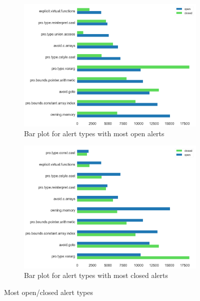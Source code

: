 \begin{figure}[H]
	\begin{subfigure}{0.5\textwidth}
		\centering
		\includegraphics[scale=0.2]{./src/data_analysis/most_open_alerts.png}
		\caption{Bar plot for alert types with most open alerts}
	\end{subfigure}%
	\begin{subfigure}{0.5\textwidth}
		\centering
		\includegraphics[scale=0.2]{./src/data_analysis/most_closed_alerts.png}
		\caption{Bar plot for alert types with most closed alerts}
	\end{subfigure}
	\caption{Most open/closed alert types}
	\label{most_open_alerts}
\end{figure}



